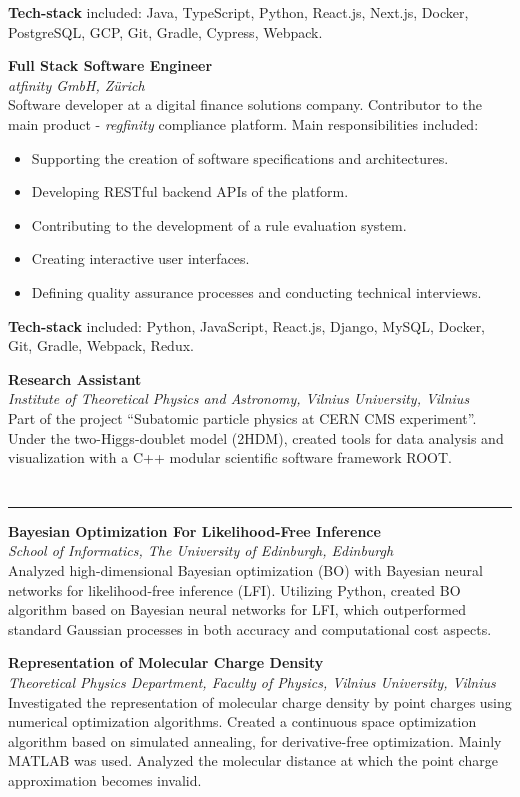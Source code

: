 \documentclass[fontsize=10pt]{article}
\let\oldsection\section
\renewcommand\section[1]{%
	\vspace{0.75\baselineskip}
    \oldsection{\color{Brown}{#1}}%
	\vspace{-0.5\baselineskip}
    \hrule height 0.75pt
    \vspace{0.75\baselineskip}
}
\newcommand\position[3]{
	\vspace{\baselineskip}
	{\large\textbf{#1}}\\[2.5pt]%
	\textit{#2}%
	\hspace*{\fill{\textit{#3}}}\\[5pt]%
}
\begin{document}
\textbf{Tech-stack} included: Java, TypeScript, Python, React.js, Next.js, Docker, PostgreSQL, GCP, Git, Gradle, Cypress, Webpack.
\vspace{0.75\baselineskip}

\position{Full Stack Software Engineer}{atfinity GmbH, Z{\"u}rich}{2018 07 -- 2019 11}
Software developer at a digital finance solutions company. Contributor to the main product - \textit{regfinity} compliance platform. Main responsibilities included:
\begin{itemize}
\setlength\itemsep{0pt}
	\item{Supporting the creation of software specifications and architectures.}
	\item{Developing RESTful backend APIs of the platform.}
	\item{Contributing to the development of a rule evaluation system.}
	\item{Creating interactive user interfaces.}
	\item{Defining quality assurance processes and conducting technical interviews.}
\end{itemize}

\textbf{Tech-stack} included: Python, JavaScript, React.js, Django, MySQL, Docker, Git, Gradle, Webpack, Redux.

\vspace{\baselineskip}

\position{Research Assistant}{Institute of Theoretical Physics and Astronomy, Vilnius University, Vilnius}{2015 07 -- 2015 09}
Part of the project ``Subatomic particle physics at CERN CMS experiment''. Under the two-Higgs-doublet model (2HDM), created tools 
for data analysis and visualization with a C++ modular scientific software framework ROOT.


\section{Research Experience}
\position{Bayesian Optimization For Likelihood-Free Inference}{School of Informatics, The University of Edinburgh, Edinburgh}{2016 -- 2017}
Analyzed high-dimensional Bayesian optimization (BO) with Bayesian neural networks for likelihood-free inference (LFI). 
Utilizing Python, created BO algorithm based on Bayesian neural networks for LFI, which outperformed standard Gaussian 
processes in both accuracy and computational cost aspects.
\vspace{0.75\baselineskip}


\position{Representation of Molecular Charge Density}{Theoretical Physics Department, Faculty of Physics, Vilnius University, Vilnius}{2015 -- 2016}
Investigated the representation of molecular charge density by point charges using numerical optimization algorithms. Created 
a continuous space optimization algorithm based on simulated annealing, for derivative-free optimization. Mainly MATLAB was 
used. Analyzed the molecular distance at which the point charge approximation becomes invalid.
\end{document}
